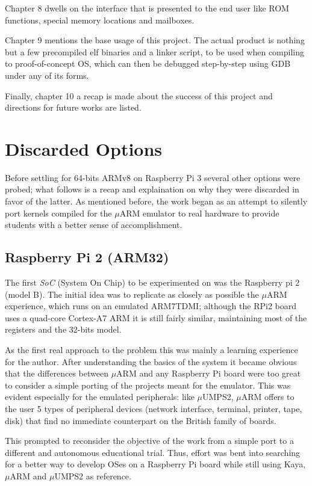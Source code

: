 \documentclass[12pt,a4paper,openright,twoside]{report}
\begin{document}
Chapter 8 dwells on the interface that is presented to the end user like ROM 
functions, special memory locations and mailboxes.

Chapter 9 mentions the base usage of this project. The actual product is nothing
but a few precompiled elf binaries and a linker script, to be used when compiling
to proof-of-concept OS, which can then be debugged step-by-step using GDB under
any of its forms.

Finally, chapter 10 a recap is made about the success of this project and directions
for future works are listed.

\clearpage{\pagestyle{empty}\cleardoublepage}
\chapter{Discarded Options}
Before settling for 64-bits ARMv8 on Raspberry Pi 3 several other options were 
probed; what follows is a recap and explaination on why they were discarded
in favor of the latter. As mentioned before, the work began as an attempt to
silently port kernels compiled for the $\mu$ARM emulator to real hardware to 
provide students with a better sense of accomplishment.

\section{Raspberry Pi 2 (ARM32)}
The first \textit{SoC} (System On Chip) to be experimented on was the Raspberry pi 2 (model B).
 The initial idea was to replicate as closely as possible the
$\mu$ARM experience, which runs on an emulated ARM7TDMI; although the RPi2 
board uses a quad-core Cortex-A7 ARM it is still fairly similar, maintaining most
of the registers and the 32-bits model.

As the first real approach to the problem this was mainly a learning experience
for the author. After understanding the basics of the system it became
obvious that the differences between $\mu$ARM and any Raspberry Pi board were 
too great to consider a simple porting of the projects meant for the emulator.
This was evident especially for the emulated peripherals: like $\mu$UMPS2, $\mu$ARM offers
to the user 5 types of peripheral devices (network interface, terminal, printer,
tape, disk) that find no immediate counterpart on the British family of boards.

This prompted to reconsider the objective of the work from a simple port to
a different and autonomous educational trial. Thus, effort was bent into searching
for a better way to develop OSes on a Raspberry Pi board while still using
Kaya, $\mu$ARM and $\mu$UMPS2 as reference.
\end{document}
